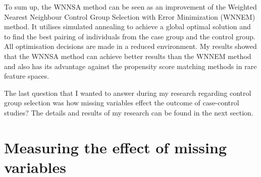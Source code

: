 		\vspace{0.5cm}
		
		To sum up, the WNNSA method can be seen as an improvement of the Weighted Nearest Neighbour Control Group Selection with Error Minimization (WNNEM) method. It utilises simulated annealing to achieve a global optimal solution and to find the best pairing of individuals from the case group and the control group. All optimisation decisions are made in a reduced environment. My results showed that the WNNSA method can achieve better results than the WNNEM method and also has its advantage against the propensity score matching methods in rare feature spaces.
									
		
		\vspace{0.5cm}
		
		The last question that I wanted to answer during my research regarding control group selection was how missing variables effect the outcome of case-control studies? The details and results of my research can be found in the next section.
		        
		\section{Measuring the effect of missing variables}
		\label{sec:missing}
										
